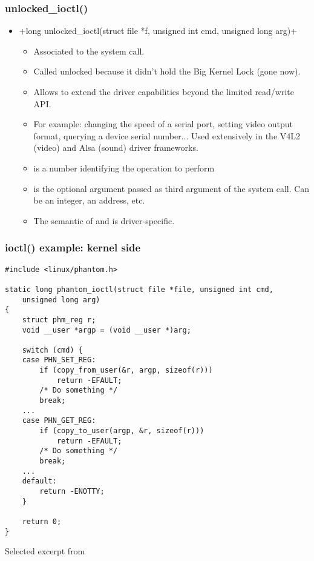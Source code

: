\begin{frame}[fragile]
  \frametitle{unlocked\_ioctl()}
  \begin{itemize}
  \item {}+long unlocked_ioctl(struct file *f, unsigned int cmd, unsigned long arg)+
    \begin{itemize}
    \item Associated to the  system call.
    \item Called unlocked because it didn't hold the Big Kernel Lock
      (gone now).
    \item Allows to extend the driver capabilities beyond the limited
      read/write API.
    \item For example: changing the speed of a serial port, setting
      video output format, querying a device serial number... Used
      extensively in the V4L2 (video) and Alsa (sound) driver frameworks.
    \item {} is a number identifying the operation to perform
    \item {} is the optional argument passed as third argument
      of the  system call. Can be an integer, an
      address, etc.
    \item The semantic of  and  is
      driver-specific.
    \end{itemize}
  \end{itemize}
\end{frame}

\begin{frame}[fragile]
  \frametitle{ioctl() example: kernel side}
\begin{verbatim}
#include <linux/phantom.h>

static long phantom_ioctl(struct file *file, unsigned int cmd,
    unsigned long arg)
{
    struct phm_reg r;
    void __user *argp = (void __user *)arg;

    switch (cmd) {
    case PHN_SET_REG:
        if (copy_from_user(&r, argp, sizeof(r)))
            return -EFAULT;
        /* Do something */
        break;
    ...
    case PHN_GET_REG:
        if (copy_to_user(argp, &r, sizeof(r)))
            return -EFAULT;
        /* Do something */
        break;
    ...
    default:
        return -ENOTTY;
    }

    return 0;
}
\end{verbatim}
\small Selected excerpt from 
\end{frame}

